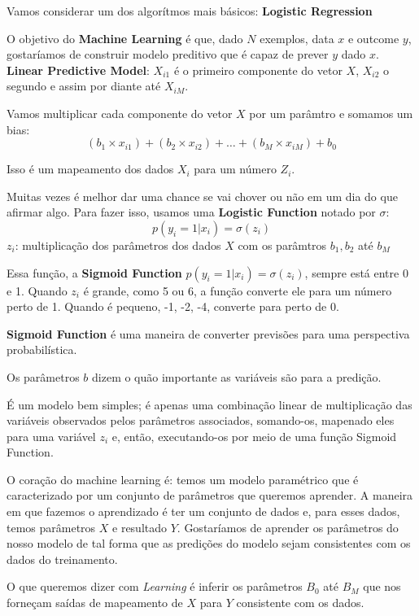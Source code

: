 \documentclass[11pt, a4paper]{article}
\begin{document}
Vamos considerar um dos algorítmos mais básicos: \textbf{Logistic Regression}

O objetivo do \textbf{Machine Learning} é que, dado $N$ exemplos, data $x$ e outcome $y$, gostaríamos de construir modelo preditivo que é capaz de prever $y$ dado $x$.\\

\textbf{Linear Predictive Model}: $X_{i1}$ é o primeiro componente do vetor $X$, $X_{i2}$ o segundo e assim por diante até $X_{iM}$.

Vamos multiplicar cada componente do vetor $X$ por um parâmtro e somamos um bias:
$$(b_1 \times x_{i1}) + (b_2 \times x_{i2}) + \dots + (b_M \times x_{iM}) + b_0 $$

Isso é um mapeamento dos dados $X_i$ para um número $Z_i$.

Muitas vezes é melhor dar uma chance se vai chover ou não em um dia do que afirmar algo. Para fazer isso, usamos uma \textbf{Logistic Function} notado por $\sigma$:
$$ p(y_i = 1 | x_i) = \sigma (z_i) $$
$z_i$: multiplicação dos parâmetros dos dados $X$ com os parâmtros $b_1, b_2$ até $b_M$

Essa função, a \textbf{Sigmoid Function} $p(y_i = 1 | x_i) = \sigma(z_i)$, sempre está entre 0 e 1. Quando $z_i$ é grande, como 5 ou 6, a função converte ele para um número perto de 1. Quando é pequeno, -1, -2, -4, converte para perto de 0.


\textbf{Sigmoid Function} é uma maneira de converter previsões para uma perspectiva probabilística.


Os parâmetros $b$ dizem o quão importante as variáveis são para a predição.


É um modelo bem simples; é apenas uma combinação linear de multiplicação das variáveis observados pelos parâmetros associados, somando-os, mapenado eles para uma variável $z_i$ e, então, executando-os por meio de uma função Sigmoid Function.


O coração do machine learning é: temos um modelo paramétrico que é caracterizado por um conjunto de parâmetros que queremos aprender. A maneira em que fazemos o aprendizado é ter um conjunto de dados e, para esses dados, temos parâmetros $X$ e resultado $Y$. Gostaríamos de aprender os parâmetros do nosso modelo de tal forma que as predições do modelo sejam consistentes com os dados do treinamento.

O que queremos dizer com \textit{Learning} é inferir os parâmetros $B_0$ até $B_M$ que nos forneçam saídas de mapeamento de $X$ para $Y$ consistente com os dados.
\end{document}
